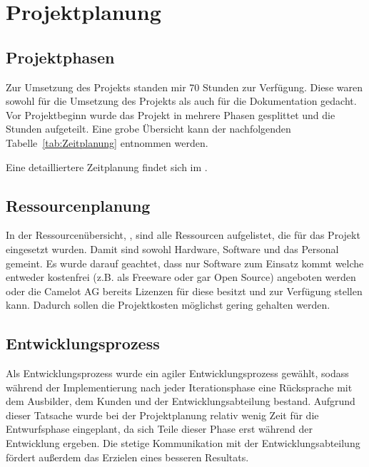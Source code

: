 \section{Projektplanung} 
\label{sec:Projektplanung}

\subsection{Projektphasen}
\label{sec:Projektphasen}
Zur Umsetzung des Projekts standen mir 70 Stunden zur Verfügung. Diese waren sowohl für die Umsetzung des Projekts als auch für die Dokumentation gedacht. Vor Projektbeginn wurde das Projekt in mehrere Phasen gesplittet und die Stunden aufgeteilt. Eine grobe Übersicht kann der nachfolgenden Tabelle~\ref{tab:Zeitplanung} entnommen werden. 

Eine detailliertere Zeitplanung findet sich im .

\subsection{Ressourcenplanung}
\label{sec:Ressourcenplanung}
In der Ressourcenübersicht, , sind alle Ressourcen aufgelistet, die für das Projekt eingesetzt wurden. Damit sind sowohl Hardware, Software und das Personal gemeint. Es wurde darauf geachtet, dass nur Software zum Einsatz kommt welche entweder kostenfrei (z.B. als Freeware oder gar Open Source) angeboten werden oder die Camelot AG bereits Lizenzen für diese besitzt und zur Verfügung stellen kann. Dadurch sollen die Projektkosten möglichst gering gehalten werden. 

\subsection{Entwicklungsprozess}
\label{sec:Entwicklungsprozess}
Als Entwicklungsprozess wurde ein agiler Entwicklungsprozess gewählt, sodass während der Implementierung nach jeder Iterationsphase eine Rücksprache mit dem Ausbilder, dem Kunden und der Entwicklungsabteilung bestand. Aufgrund dieser Tatsache wurde bei der Projektplanung relativ wenig Zeit für die Entwurfsphase eingeplant, da sich Teile dieser Phase erst während der Entwicklung ergeben. Die stetige Kommunikation mit der Entwicklungsabteilung fördert außerdem das Erzielen eines besseren Resultats.
